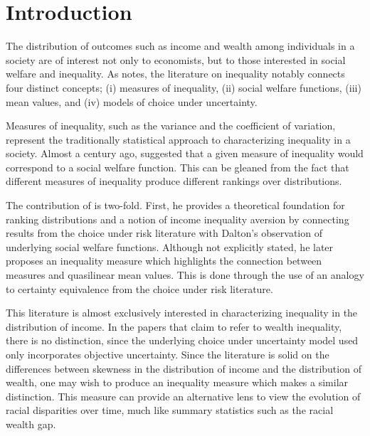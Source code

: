 \documentclass[../../../00-main.tex]{subfiles}
\begin{document}
\hypertarget{Introduction}{}
\section{Introduction}\label{sec:intro}


\par The distribution of outcomes such as income and wealth among individuals in a society are of interest not only to economists, but to those interested in social welfare and inequality. As \cite{ch83} notes, the literature on inequality notably connects four distinct concepts; (i) measures of inequality, (ii) social welfare functions, (iii) mean values, and (iv) models of choice under uncertainty.

\par Measures of inequality, such as the variance and the coefficient of variation, represent the traditionally statistical approach to characterizing inequality in a society. Almost a century ago, \cite{hd20} suggested that a given measure of inequality would correspond to a social welfare function. This can be gleaned from the fact that different measures of inequality produce different rankings over distributions.

\par The contribution of \cite{aa70} is two-fold. First, he provides a theoretical foundation for ranking distributions and a notion of income inequality aversion by connecting results from the choice under risk literature with Dalton's observation of underlying social welfare functions. Although not explicitly stated, he later proposes an inequality measure which highlights the connection between measures and quasilinear mean values. This is done through the use of an analogy to certainty equivalence from the choice under risk literature.

\par This literature is almost exclusively interested in characterizing inequality in the distribution of income. In the papers that claim to refer to wealth inequality, there is no  distinction, since the underlying choice under uncertainty model used only incorporates objective uncertainty. Since the literature is solid on the differences between skewness in the distribution of income and the distribution of wealth, one may wish to produce an inequality measure which makes a similar distinction. This measure can provide an alternative lens to view the evolution of racial disparities over time, much like summary statistics such as the racial wealth gap.  
\end{document}
